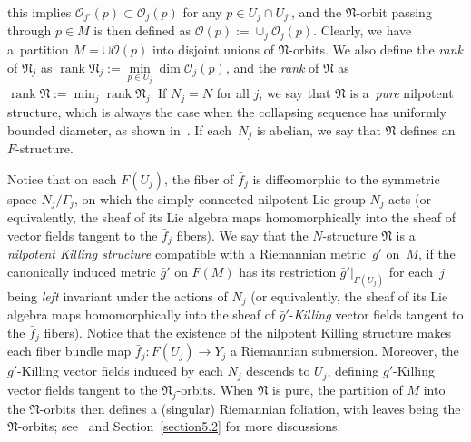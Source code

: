 \documentclass[10pt,a4paper]{amsart}
\numberwithin{equation}{section}
\newcommand{\rank}{\operatorname{rank}}
\begin{document}
this implies $\mathcal{O}_{j'}(p)\subset \mathcal{O}_j(p)$ for any $p\in
U_j\cap U_{j'}$, and the $\mathfrak{N}$-orbit passing through $p\in M$ is then
defined as $\mathcal{O}(p):=\cup_j \mathcal{O}_j(p)$. Clearly, we have a~partition $M=\cup \mathcal{O}(p)$ into disjoint unions of $\mathfrak{N}$-orbits.
We also define the \emph{rank} of $\mathfrak{N}_j$ as $\rank
\mathfrak{N}_j:=\min\limits_{p\in U_j}\dim \mathcal{O}_j(p)$, and the \emph{rank} of
$\mathfrak{N}$ as $\rank \mathfrak{N}:=\min_j\rank \mathfrak{N}_j$. If
$N_j=N$ for all $j$, we say that $\mathfrak{N}$ is a~\emph{pure} nilpotent
structure, which is always the case when the collapsing sequence has uniformly
bounded diameter, as shown in~\cite{Fukaya89}. If each~$N_j$ is abelian, we say
that $\mathfrak{N}$ defines an $F$-structure.

Notice that on each $F(U_j)$, the fiber of $\bar{f}_j$ is diffeomorphic to the
symmetric space $N_j\slash \Gamma_j$, on which the simply connected nilpotent
Lie group $N_j$ acts (or equivalently, the sheaf of its Lie algebra maps
homomorphically into the sheaf of vector fields tangent to the $\bar{f}_j$
fibers). We say that the $N$-structure $\mathfrak{N}$ is a \emph{nilpotent
Killing structure} compatible with a Riemannian metric~$g'$ on~$M$, if the
canonically induced metric $\bar{g}'$ on $F(M)$ has its restriction
$\bar{g}'|_{F(U_j)}$ for each~$j$ being \emph{left} invariant under the actions
of $N_j$ (or equivalently, the sheaf of its Lie algebra maps homomorphically
into the sheaf of $\bar{g}'$-\emph{Killing} vector fields tangent to the
$\bar{f}_j$ fibers). Notice that the existence of the nilpotent Killing
structure makes each fiber bundle map $\bar{f}_j\colon F(U_j)\to Y_j$ a Riemannian
submersion. Moreover, the $\bar{g}'$-Killing vector fields induced by each
$N_j$ descends to $U_j$, defining $g'$-Killing vector fields tangent to the
$\mathfrak{N}_j$-orbits. When $\mathfrak{N}$ is pure, the partition
of $M$ into the $\mathfrak{N}$-orbits then defines a (singular) Riemannian
foliation, with leaves being the $\mathfrak{N}$-orbits; see~\cite{Molino88} and
Section~\ref{section5.2} for more discussions.
\end{document}
